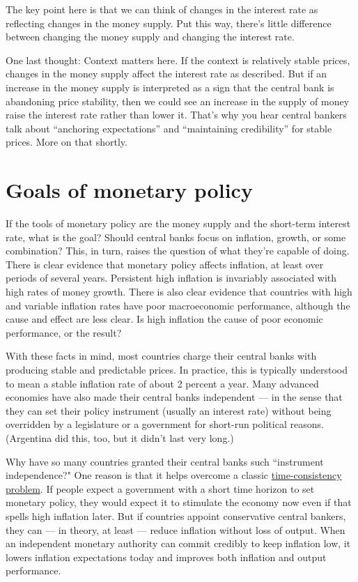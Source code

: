 The key point here is that we can think of changes in the interest
rate as reflecting changes in the money supply.
Put this way, there's little difference between changing the money supply
and changing the interest rate.

One last thought:  Context matters here.
If the context is relatively stable prices, changes in the
money supply affect the interest rate as described.
But if an increase in the money supply is interpreted as a sign
that the central bank  is abandoning price stability,
then we could see an increase in the supply of money
raise the interest rate rather than lower it.
That's why you hear central bankers  talk about ``anchoring expectations''
and ``maintaining credibility'' for stable prices.
More on that shortly.

\section{Goals of monetary policy}

If the tools of monetary policy are the money supply and the short-term
interest rate, what is the goal?
Should central banks  focus
on inflation, growth, or some combination?
This, in turn, raises the question of what they're capable of doing.
There is clear evidence that monetary policy affects inflation,
at least over periods of several years.
Persistent high inflation is invariably associated with
high rates of money growth.
There is also clear evidence that
countries with high and variable inflation rates have poor
macroeconomic performance,
although the cause and effect are less clear. Is high inflation the cause of poor economic performance,
or the result?

With these facts in mind, most countries charge their central
banks with producing stable and predictable prices. In practice,
this is typically understood to mean a stable inflation rate of
about 2 percent a year.
Many advanced economies have also made their
central banks  independent --- in the sense that they can set their
policy instrument (usually an interest rate) without being overridden
by a legislature or a government for short-run political reasons.
(Argentina did this, too, but it didn't last very long.)

Why have so many countries granted their central banks  such
 ``instrument independence?" One reason is that it helps overcome
 a classic  \hyperref[sec:time_cons]{time-consistency problem}.
If people expect a government
with a short time horizon to set monetary policy, they would expect it to stimulate
the economy now even if that spells high inflation later.
But if countries appoint conservative central bankers,
they can --- in theory, at least --- reduce inflation without loss of output.
When an independent monetary authority can commit credibly to keep
inflation low, it lowers inflation expectations today and improves
both inflation and output performance.

